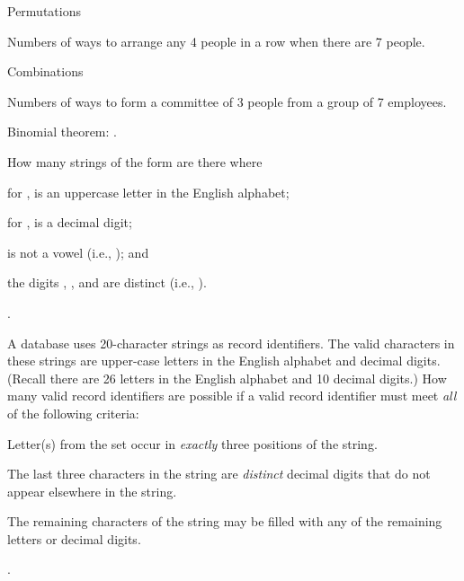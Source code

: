 			\item  Permutations

				Numbers of ways to arrange any 4 people in a row when there are 7 people.

			\item  Combinations

				Numbers of ways to form a committee of 3 people from a group of 7 employees.

			\item  Binomial theorem: .

		\stopitemize

		\page

		\startexercise [title={AC Ex 2.7}]
			How many strings of the form  are there where
			\startitemize [m, joinedup]
				\item  for ,  is an uppercase letter in the English alphabet;
				\item  for ,  is a decimal digit;
				\item  {} is not a vowel (i.e., ); and
				\item  the digits , , and  are distinct (i.e., ).
			\stopitemize
		\stopexercise

		\startsolution
			.
		\stopsolution


		\startexercise [title={AC Ex 2.9}]
			A database uses 20-character strings as record identifiers. The valid characters in these strings are upper-case letters in the English alphabet and decimal digits. (Recall there are 26 letters in the English alphabet and 10 decimal digits.) How many valid record identifiers are possible if a valid record identifier must meet \emph{all} of the following criteria:
			\startitemize [m, joinedup]
				\item  Letter(s) from the set  occur in \emph{exactly} three positions of the string.
				\item  The last three characters in the string are \emph{distinct} decimal digits that do not appear elsewhere in the string.
				\item  The remaining characters of the string may be filled with any of the remaining letters or decimal digits.
			\stopitemize
		\stopexercise

		\startsolution
			.
		\stopsolution
	
